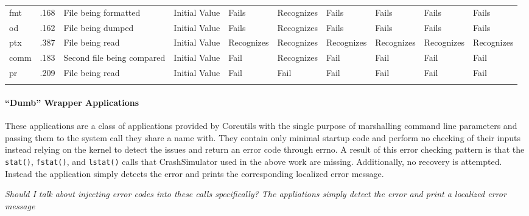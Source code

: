 \begin{table*}[t]
\begin{tabular}{l  l  l  l  l  l  l  l  l  l}
          fmt         & .168                             & File being formatted       & Initial Value  & Fails          & Recognizes  & Fails      & Fails       & Fails      & Fails\\
          od          & .162                             & File being dumped          & Initial Value  & Fails          & Recognizes  & Fails      & Fails       & Fails      & Fails\\
          ptx         & .387                             & File being read            & Initial Value  & Recognizes     & Recognizes  & Recognizes & Recognizes  & Recognizes & Recognizes\\
          comm        & .183                             & Second file being compared & Initial Value  & Fail           & Recognizes  & Fail       & Fail        & Fail       & Fail\\
          pr          & .209                             & File being read            & Initial Value  & Fail           & Fail        & Fail       & Fail        & Fail       & Fail\\
        \bottomrule{}
        \end{tabular}
    \end{table*}


\paragraph{``Dumb'' Wrapper Applications}

These applications are a class of applications provided by Coreutils with the single purpose of marshalling
command line parameters and passing them to the system call they share a name with.  They contain only minimal startup
code and perform no checking of their inputs instead relying on the kernel to detect the issues and return an error code
through errno.  A result of this error checking pattern is that the 
{\tt stat()}, {\tt fstat()}, and {\tt lstat()}
calls that CrashSimulator used in the above work are missing.  Additionally, no recovery is attempted.  Instead the
application simply detects the error and prints the corresponding localized error message.

\emph{Should I talk about injecting error codes into these calls specifically?  The appliations simply detect the
  error and print a localized error message}


